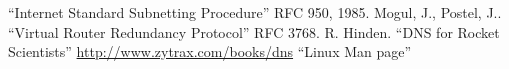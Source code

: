\documentclass[a4paper,10pt, fleqn]{article}
\title{  }
\begin{document}
\maketitle 

\tableofcontents 
\newpage


\newpage

\newpage

\newpage

\newpage

\newpage


\newpage
\begin{thebibliography}{99}
	 ``Internet Standard Subnetting Procedure'' RFC 950, 1985.  Mogul, J., Postel, J..
	 ``Virtual Router Redundancy Protocol'' RFC 3768.  R. Hinden.
	 ``DNS for Rocket Scientists''  \url{http://www.zytrax.com/books/dns}
	 ``Linux Man page''
\end{thebibliography}
\end{document}

